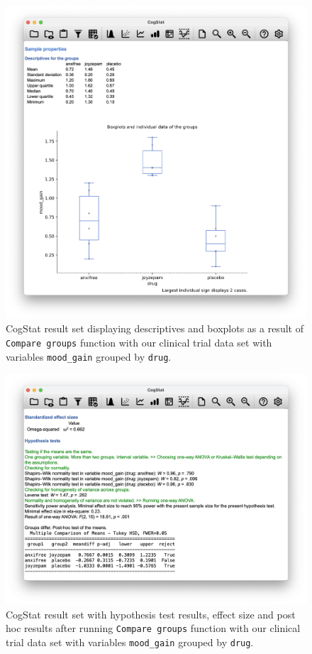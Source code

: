 \documentclass[
]{book}
\theoremstyle{definition}
\theoremstyle{definition}
\theoremstyle{definition}
\theoremstyle{definition}
\theoremstyle{remark}
\begin{document}
\begin{figure}

{\centering \includegraphics[width=0.66\linewidth]{resources/image/moodbydrug} 

}

\caption{CogStat result set displaying descriptives and boxplots as a result of \texttt{Compare\ groups} function with our clinical trial data set with variables \texttt{mood\_gain} grouped by \texttt{drug}.}\label{fig:cogcompbydrugdescr}
\end{figure}



\begin{figure}

{\centering \includegraphics[width=0.66\linewidth]{resources/image/moodbydrughypo} 

}

\caption{CogStat result set with hypothesis test results, effect size and post hoc results after running \texttt{Compare\ groups} function with our clinical trial data set with variables \texttt{mood\_gain} grouped by \texttt{drug}.}\label{fig:cogcompbydrug}
\end{figure}
\end{document}
